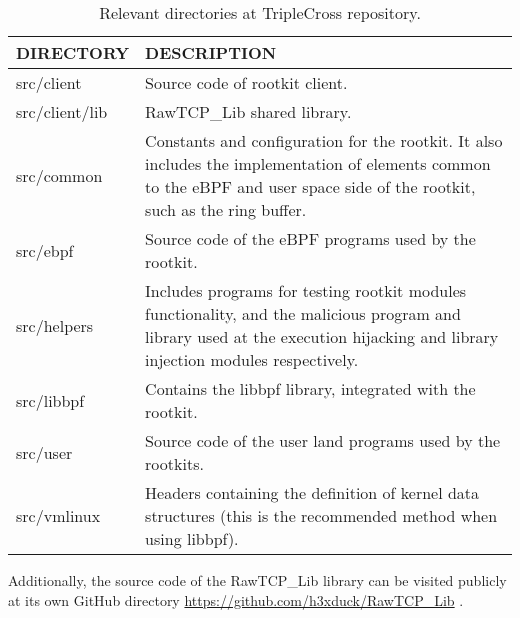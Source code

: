 \begin{table}[htbp]
\begin{tabular}{|>{\centering\arraybackslash}p{4cm}|>{\centering\arraybackslash}p{10cm}|}
\hline
\textbf{DIRECTORY} & \textbf{DESCRIPTION}\\
\hline
\hline
src/client & Source code of rootkit client.\\
\hline
src/client/lib & RawTCP\_Lib shared library.\\
\hline
src/common & Constants and configuration for the rootkit. It also includes the implementation of elements common to the eBPF and user space side of the rootkit, such as the ring buffer.\\
\hline
src/ebpf & Source code of the eBPF programs used by the rootkit.\\
\hline
src/helpers & Includes programs for testing rootkit modules functionality, and the malicious program and library used at the execution hijacking and library injection modules respectively.\\
\hline
src/libbpf & Contains the libbpf library, integrated with the rootkit.\\
\hline
src/user & Source code of the user land programs used by the rootkits.\\
\hline
src/vmlinux & Headers containing the definition of kernel data structures (this is the recommended method when using libbpf).\\
\hline
\end{tabular}
\caption{Relevant directories at TripleCross repository.}
\label{table:triplecross_dirs}
\end{table} 

Additionally, the source code of the RawTCP\_Lib library can be visited publicly at its own GitHub directory \url{https://github.com/h3xduck/RawTCP_Lib} \cite{rawtcp_lib}.

